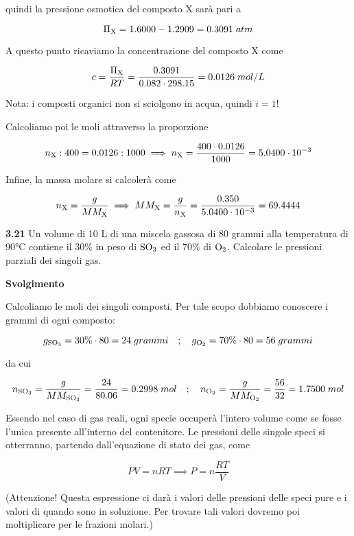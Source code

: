 quindi la pressione osmotica del composto X sarà pari a

$$\Pi_{\rm X}=1.6000 - 1.2909 = 0.3091\;atm$$

A questo punto ricaviamo la concentrazione del composto X come

$$c=\frac{\Pi_{\rm X}}{RT}=\frac{0.3091}{0.082 \cdot 298.15}
=0.0126\;mol/L$$

Nota: i composti organici non si sciolgono in acqua, quindi $i=1$!

Calcoliamo poi le moli attraverso la proporzione

$$n_{\rm X}:400=0.0126:1000
\implies
n_{\rm X}=\frac{400 \cdot 0.0126}{1000}
=5.0400 \cdot 10^{-3}$$

Infine, la massa molare si calcolerà come

$$n_{\rm X}=\frac{g}{MM_{\rm X}}
\implies
MM_{\rm X}=\frac{g}{n_{\rm X}}=\frac{0.350}{5.0400 \cdot 10^{-3}}=69.4444$$

\vspace{0.2cm}\textbf{3.21} Un volume di 10 L di una miscela gassosa di 80 grammi alla temperatura di 90°C contiene il
30\% in peso di $\rm SO_3$ ed il 70\% di $\rm O_2$. Calcolare le pressioni parziali dei singoli gas.

\vspace{0.2cm}\large\textbf{Svolgimento}\normalsize

\vspace{0.2cm}Calcoliamo le moli dei singoli composti. Per tale scopo dobbiamo conoscere i grammi di ogni composto:

$$g_{\rm SO_3}=30\% \cdot 80=24\;grammi
\quad;\quad
g_{\rm O_2}=70\% \cdot 80=56\;grammi$$

da cui

\vspace{-0.2cm}$$n_{\rm SO_3}=\frac{g}{MM_{\rm SO_3}}=\frac{24}{80.06}=0.2998\;mol
\quad;\quad
n_{\rm O_2}=\frac{g}{MM_{\rm O_2}}=\frac{56}{32}=1.7500\;mol$$

Essendo nel caso di gas reali, ogni specie occuperà l'intero volume come se fosse l'unica presente all'interno del contenitore. Le pressioni delle singole speci si otterranno, partendo dall'equazione di stato dei gas, come

$$PV=nRT \implies
P=n\frac{RT}{V}$$

(Attenzione! Questa espressione ci darà i valori delle pressioni delle speci pure e i valori di quando sono in soluzione. Per trovare tali valori dovremo poi moltiplicare per le frazioni molari.)

